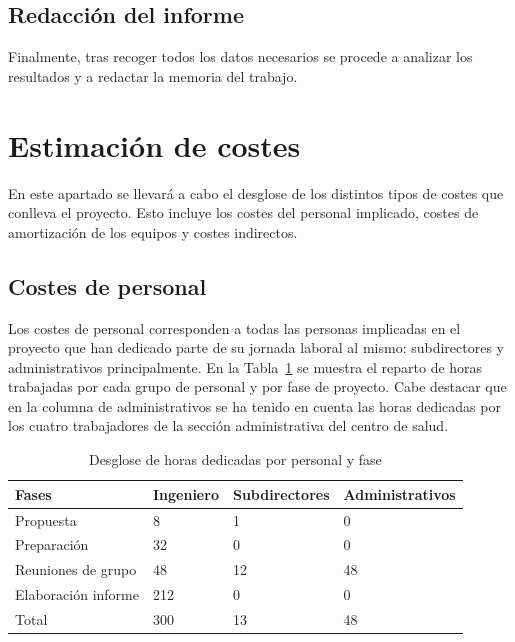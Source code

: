 \subsection{Redacción del informe}

Finalmente, tras recoger todos los datos necesarios se procede a analizar los resultados y a redactar la memoria del trabajo. 

\section{Estimación de costes}

En este apartado se llevará a cabo el desglose de los distintos tipos de costes que conlleva el proyecto. Esto incluye los costes del personal implicado, costes de amortización de los equipos y costes indirectos.

\subsection{Costes de personal}

Los costes de personal corresponden a todas las personas implicadas en el proyecto que han dedicado parte de su jornada laboral al mismo: subdirectores y administrativos principalmente.
En la Tabla~\ref{tab:horas-trabajadas} se muestra el reparto de horas trabajadas por cada grupo de personal y por fase de proyecto.
Cabe destacar que en la columna de administrativos se ha tenido en cuenta las horas dedicadas por los cuatro trabajadores de la sección administrativa del centro de salud.

\begin{table}[H]
    \centering
    \begin{tabular}{llll}
        \toprule
        Fases               & Ingeniero & Subdirectores & Administrativos \\
        \midrule
        Propuesta           & 8         & 1             & 0               \\
        Preparación         & 32        & 0             & 0               \\
        Reuniones de grupo  & 48        & 12            & 48              \\
        Elaboración informe & 212       & 0             & 0               \\
        \midrule
        Total               & 300       & 13            & 48              \\
        \bottomrule
    \end{tabular}
    \caption{Desglose de horas dedicadas por personal y fase}
    \label{tab:horas-trabajadas}
\end{table}

